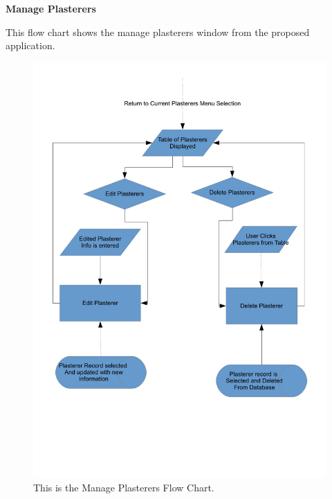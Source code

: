 \pagebreak
\textbf{Manage Plasterers}
\begin{flushleft}
This flow chart shows the manage plasterers window from the proposed application.
\end{flushleft}
\begin{figure}[H]
\includegraphics[scale=0.5]{./Design/images/FlowChartManagePlasterers.pdf}
    \caption{This is the Manage Plasterers Flow Chart.} 
\label{fig:FlowChartManagePlasterers}
\end{figure}

